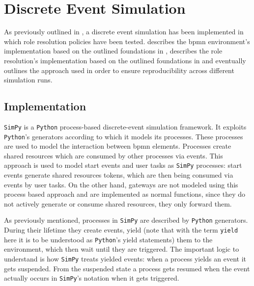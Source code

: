 \chapter{Discrete Event Simulation}
\label{ch:discrete_event_sim}

As previously outlined in , a discrete event simulation has been implemented in which role resolution policies have been tested.  describes the \gls{bpmn} environment's implementation based on the outlined foundations in ,  describes the role resolution's implementation based on the outlined foundations in  and eventually  outlines the approach used in order to ensure reproducibility across different simulation runs.

\section{ Implementation}
\label{sec:bpmn_implementation}

\texttt{SimPy} is a \texttt{Python} process-based discrete-event simulation framework. It exploits \texttt{Python}'s generators according to which it models its processes. These processes are used to model the interaction between \gls{bpmn} elements. Processes create shared resources which are consumed by other processes via events. This approach is used to model start events and user tasks as \texttt{SimPy} processes: start events generate shared resources \ie tokens, which are then being consumed via events by user tasks. On the other hand, gateways are not modeled using this process based approach and are implemented as normal functions, since they do not actively generate or consume shared resources, they only forward them.

As previously mentioned, processes in \texttt{SimPy} are described by \texttt{Python} generators. During their lifetime they create events, yield (note that with the term \texttt{yield} here it is to be understood as \texttt{Python}'s yield statements) them to the environment, which then wait until they are triggered. The important logic to understand is how \texttt{SimPy} treats yielded events: when a process yields an event it gets suspended. From the suspended state a process gets resumed when the event actually occurs \ie in \texttt{SimPy}'s notation when it gets triggered.

